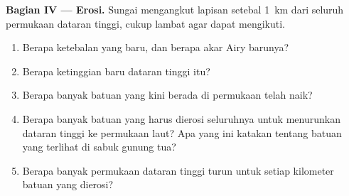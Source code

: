 \begin{problem}
\noindent\textbf{Bagian IV --- Erosi.}
Sungai mengangkut lapisan setebal \qty{1}{km} dari seluruh permukaan dataran tinggi, cukup lambat agar  dapat mengikuti.
\begin{enumerate}[resume]
  \item Berapa ketebalan  yang baru, dan berapa akar Airy barunya?
  \item Berapa ketinggian baru dataran tinggi itu?
  \item Berapa banyak batuan yang kini berada di permukaan telah naik?
  \item Berapa banyak batuan yang harus dierosi seluruhnya untuk menurunkan dataran tinggi ke permukaan laut? Apa yang ini katakan tentang batuan yang terlihat di sabuk gunung tua?
  \item Berapa banyak permukaan dataran tinggi turun untuk setiap kilometer batuan yang dierosi?
\end{enumerate}
\end{problem}
